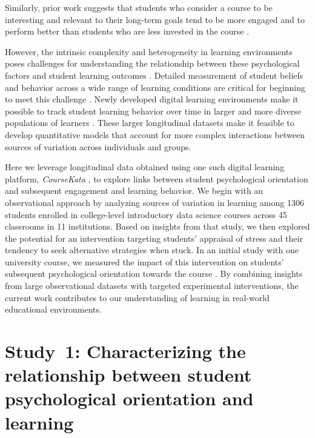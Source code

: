 \documentclass[10pt,letterpaper]{article}
\newcommand{\ck}{\textit{CourseKata}}
\begin{document}
Similarly, prior work suggests that students who consider a course to be interesting and relevant to their long-term goals tend to be more engaged and to perform better than students who are less invested in the course \cite{hulleman2009promoting, harackiewicz2016interest}. 

However, the intrinsic complexity and heterogeneity in learning environments poses challenges for understanding the relationship between these psychological factors and student learning outcomes \cite{brown1992design}. 
Detailed measurement of student beliefs and behavior across a wide range of learning conditions are critical for beginning to meet this challenge \cite{bryan2021behavioural}.
Newly developed digital learning environments make it possible to track student learning behavior over time in larger and more diverse populations of learners \cite{reza2021mooclet, stigler2020better, motz2018embedding, lovett2008jime}.
These larger longitudinal datasets make it feasible to develop quantitative models that account for more complex interactions between sources of variation across individuals and groups.

Here we leverage longitudinal data obtained using one such digital learning platform, \ck{} \cite{stigler2020better}, to explore links between student psychological orientation and subsequent engagement \cite{gao2025predicting, henrie2015measuring} and learning behavior. 
We begin with an observational approach by analyzing sources of variation in learning among 1306 students enrolled in college-level introductory data science courses across 45 classrooms in 11 institutions.
Based on insights from that study, we then explored the potential for an intervention targeting students' appraisal of stress and their tendency to seek alternative strategies when stuck.
In an initial study with one university course, we measured the impact of this intervention on students' subsequent psychological orientation towards the course \cite{yeager2022synergistic, Chen2020strategic}.
By combining insights from large observational datasets with targeted experimental interventions, the current work contributes to our understanding of learning in real-world educational environments. 

\section{Study~1: Characterizing the relationship between student psychological orientation and learning}
\end{document}
